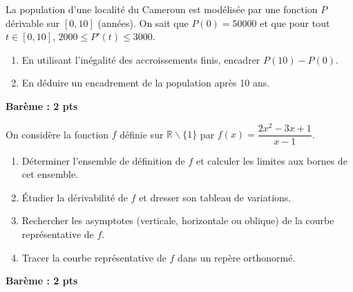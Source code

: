 \documentclass[11pt]{article}
\def\setminus{\mathbin{\backslash}}\let\smallsetminus\setminus
\begin{document}
\begin{exercice}
La population d'une localité du Cameroun est modélisée par une fonction $P$ dérivable sur $[0, 10]$ (années). On sait que $P(0) = 50000$ et que pour tout $t \in [0, 10]$, $2000 \le P'(t) \le 3000$.
\begin{enumerate}
    \item En utilisant l'inégalité des accroissements finis, encadrer $P(10) - P(0)$.
    \item En déduire un encadrement de la population après 10 ans.
\end{enumerate}
\textbf{Barème : 2 pts}
\end{exercice}

\begin{exercice}
On considère la fonction $f$ définie sur $\mathbb{R} \setminus \{1\}$ par $f(x) = \dfrac{2x^2 - 3x + 1}{x - 1}$.
\begin{enumerate}
    \item Déterminer l'ensemble de définition de $f$ et calculer les limites aux bornes de cet ensemble.
    \item Étudier la dérivabilité de $f$ et dresser son tableau de variations.
    \item Rechercher les asymptotes (verticale, horizontale ou oblique) de la courbe représentative de $f$.
    \item Tracer la courbe représentative de $f$ dans un repère orthonormé.
\end{enumerate}
\textbf{Barème : 2 pts}
\end{exercice}
\end{document}
